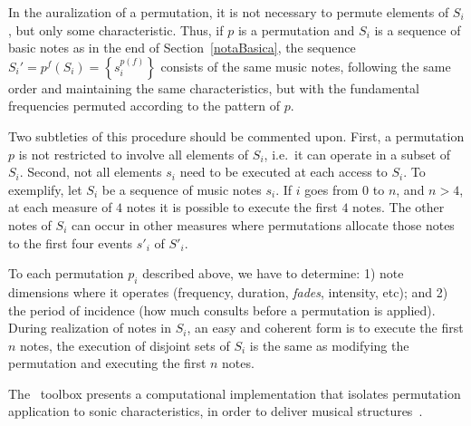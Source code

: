 In the auralization of a permutation, it is not necessary to permute elements of $S_i$,
but only some characteristic. Thus, if $p$ is a permutation and $S_i$ is a sequence of basic notes as in the end of Section~\ref{notaBasica}, the
sequence $S_i'=p^f(S_i)=\left\{s_i^{p(f)}\right\}$ consists of the same
music notes, following the same order and maintaining the same characteristics, but with the
fundamental frequencies permuted according to the pattern of $p$.

Two subtleties of this procedure should be commented upon. 
First, a permutation $p$ is not restricted to involve all elements of $S_i$, i.e.\ it can operate in a subset of $S_i$.
Second, not all elements $s_i$ need to be executed at each access to $S_i$. To exemplify, let $S_i$ be a sequence of music notes $s_i$. 
If $i$ goes from $0$ to $n$, and
$n>4$, at each measure of $4$ notes it is possible to execute the first $4$
notes.
The other notes of $S_i$ can occur in other measures where permutations 
allocate those notes to the first four events $s'_i$ of $S'_i$.

To each permutation $p_i$ described above, we have to determine:
1) note dimensions where it operates (frequency, duration, \emph{fades},
intensity, etc); and
2) the period of incidence (how much consults before a permutation is
applied). During realization of notes in $S_i$, an easy and coherent form is to
execute the first $n$ notes, the execution of disjoint sets of $S_i$
is the same as modifying the permutation and executing the first $n$ notes.

The \massa\ toolbox presents a computational implementation that isolates
permutation application to sonic characteristics, in order to deliver
musical structures~\cite{MASSA,figgusOriginal,figgusEspacializacao}.

